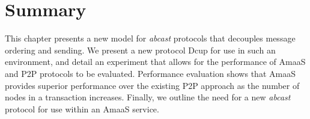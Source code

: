 \section{Summary}
This chapter presents a new model for \emph{abcast} protocols that decouples message ordering and sending.  We present a new protocol \textsf{Dcup} for use in such an environment, and detail an experiment that allows for the performance of \textsf{AmaaS} and P2P protocols to be evaluated.  Performance evaluation shows that \textsf{AmaaS} provides superior performance over the existing P2P approach as the number of nodes in a transaction increases.  Finally, we outline the need for a new \emph{abcast} protocol for use within an \textsf{AmaaS} service. 
